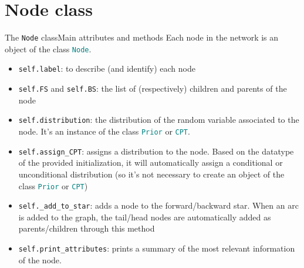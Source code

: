 \documentclass[10pt,xcolor={table,dvipsnames}]{beamer} 		%
\theoremstyle{plain}					%
\theoremstyle{definition}
\theoremstyle{remark}
\newcommand{\ttteal}[1]{\texttt{\textcolor{teal}{#1}}}
\newcommand{\pdb}[1]{\textcolor{pythondb}{#1}}
\begin{document}
\section*{Node class}
	\begin{frame}{The \texttt{Node} class}{Main attributes and methods}
		Each node in the network is an object of the class \ttteal{Node}.
		
		\begin{itemize}
			\item<2-> \texttt{\pdb{self}.label}: to describe (and identify) each node 
			\item<3-> \texttt{\pdb{self}.FS} and \texttt{\pdb{self}.BS}: the list of
			(respectively) children and parents of the node
			\item<4-> \texttt{\pdb{self}.distribution}: the distribution of the 
			random variable associated to the node. 
			It's an instance of the class \ttteal{Prior}
			or \ttteal{CPT}. 
		\end{itemize}

		\begin{itemize}
			\item<5-> \texttt{\pdb{self}.assign\_CPT}: assigns a distribution to 
			the node. Based on the datatype of the provided initialization, 
			it will automatically assign a conditional or unconditional distribution 
			(so it's not necessary to create an object of the class \ttteal{Prior} or \ttteal{CPT})
			\item<6-> \texttt{\pdb{self}.\_add\_to\_star}: adds a node to the 
			forward/backward star. When an arc is added to the graph, the 
			tail/head nodes are automatically added as parents/children through this method
			\item<7-> \texttt{\pdb{self}.print\_attributes}: prints a summary of the most 
			relevant information of the node.
		\end{itemize}
	\end{frame}

\end{document}
